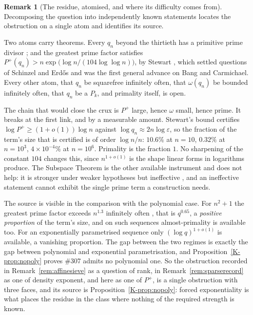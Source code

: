 \documentclass[11pt]{article}
\theoremstyle{definition}
\newtheorem{remark}[theorem]{Remark}
\begin{document}
\begin{remark}[The residue, atomised, and where its difficulty comes from]\label{rem:atomised}
Decomposing the question into independently known statements locates the obstruction on a single
atom and identifies its source.

Two atoms carry theorems. Every $q_n$ beyond the thirtieth has a primitive prime divisor
\cite{BHV2001}; and the greatest prime factor satisfies
$P^+(q_n)>n\exp\bigl(\log n/(104\log\log n)\bigr)$, by Stewart \cite{Stewart2013}, which settled
questions of Schinzel and Erd\H{o}s and was the first general advance on Bang and Carmichael. Every
other atom, that $q_n$ be squarefree infinitely often, that $\omega(q_n)$ be bounded infinitely
often, that $q_n$ be a $P_k$, and primality itself, is open.

The chain that would close the crux is $P^+$ large, hence $\omega$ small, hence prime. It breaks at
the first link, and by a measurable amount. Stewart's bound certifies
$\log P^+\ge(1+o(1))\log n$ against $\log q_n\approx2n\log\varepsilon$, so the fraction of the
term's size that is certified is of order $\log n/n$: $10.6\%$ at $n=10$, $0.32\%$ at $n=10^3$,
$4\times10^{-4}\%$ at $n=10^6$. Primality is the fraction $1$. No sharpening of the constant $104$
changes this, since $n^{1+o(1)}$ is the shape linear forms in logarithms produce. The Subspace
Theorem is the other available instrument and does not help: it is stronger under weaker hypotheses
but ineffective \cite{BCZ2003}, and an ineffective statement cannot exhibit the single prime term a
construction needs.

The source is visible in the comparison with the polynomial case. For $n^2+1$ the greatest prime
factor exceeds $n^{1.3}$ infinitely often \cite{Merikoski2019}, that is $q^{0.65}$, a \emph{positive
proportion} of the term's size, and on such sequences almost-primality is available too. For an
exponentially parametrised sequence only $(\log q)^{1+o(1)}$ is available, a vanishing proportion.
The gap between the two regimes is exactly the gap between polynomial and exponential
parametrisation, and Proposition~\ref{K-prop:nopoly} proves \#307 admits no polynomial one. So the
obstruction recorded in Remark~\ref{rem:affinesieve} as a question of rank, in
Remark~\ref{rem:sparserecord} as one of density exponent, and here as one of $P^+$, is a single
obstruction with three faces, and its source is Proposition~\ref{K-prop:nopoly}: forced exponentiality
is what places the residue in the class where nothing of the required strength is known.


\end{remark}
\end{document}
